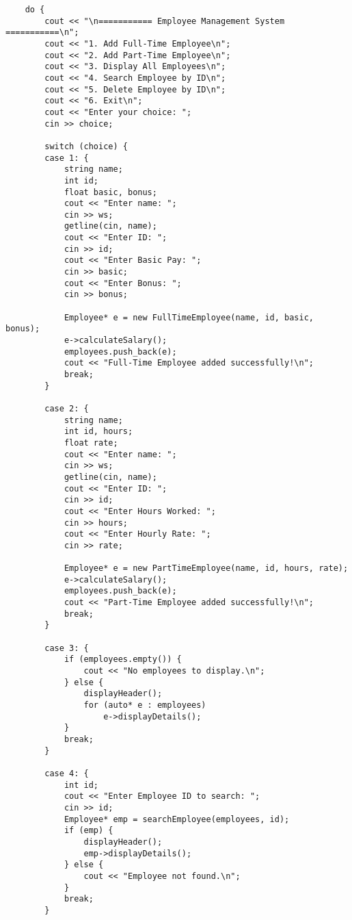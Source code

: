 \documentclass[12pt,a4paper]{article}
\begin{document}
\begin{lstlisting}
    do {
        cout << "\n=========== Employee Management System ===========\n";
        cout << "1. Add Full-Time Employee\n";
        cout << "2. Add Part-Time Employee\n";
        cout << "3. Display All Employees\n";
        cout << "4. Search Employee by ID\n";
        cout << "5. Delete Employee by ID\n";
        cout << "6. Exit\n";
        cout << "Enter your choice: ";
        cin >> choice;

        switch (choice) {
        case 1: {
            string name;
            int id;
            float basic, bonus;
            cout << "Enter name: ";
            cin >> ws;
            getline(cin, name);
            cout << "Enter ID: ";
            cin >> id;
            cout << "Enter Basic Pay: ";
            cin >> basic;
            cout << "Enter Bonus: ";
            cin >> bonus;

            Employee* e = new FullTimeEmployee(name, id, basic, bonus);
            e->calculateSalary();
            employees.push_back(e);
            cout << "Full-Time Employee added successfully!\n";
            break;
        }

        case 2: {
            string name;
            int id, hours;
            float rate;
            cout << "Enter name: ";
            cin >> ws;
            getline(cin, name);
            cout << "Enter ID: ";
            cin >> id;
            cout << "Enter Hours Worked: ";
            cin >> hours;
            cout << "Enter Hourly Rate: ";
            cin >> rate;

            Employee* e = new PartTimeEmployee(name, id, hours, rate);
            e->calculateSalary();
            employees.push_back(e);
            cout << "Part-Time Employee added successfully!\n";
            break;
        }

        case 3: {
            if (employees.empty()) {
                cout << "No employees to display.\n";
            } else {
                displayHeader();
                for (auto* e : employees)
                    e->displayDetails();
            }
            break;
        }

        case 4: {
            int id;
            cout << "Enter Employee ID to search: ";
            cin >> id;
            Employee* emp = searchEmployee(employees, id);
            if (emp) {
                displayHeader();
                emp->displayDetails();
            } else {
                cout << "Employee not found.\n";
            }
            break;
        }


\end{lstlisting}
\end{document}
